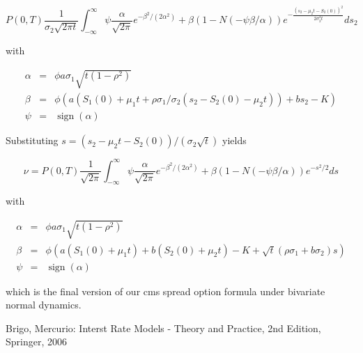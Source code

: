\documentclass{amsart}
\theoremstyle{plain}
\numberwithin{equation}{section}
\DeclareMathOperator{\sign}{sign}
\begin{document}
\begin{equation}
P(0,T) \frac{1}{\sigma_2\sqrt{2\pi t}} \int_{-\infty}^\infty \psi\frac{\alpha}{\sqrt{2\pi}}e^{-\beta^2/(2\alpha^2)}+\beta(1-N(-\psi\beta/\alpha))e^{-\frac{(s_2-\mu_2t-S_2(0))^2}{2\sigma_2^2 t}} ds_2
\end{equation}

with

\begin{eqnarray}
\alpha &=& \phi a \sigma_1 \sqrt{t(1-\rho^2)} \\
\beta &=& \phi \left( a (S_1(0) + \mu_1 t + \rho\sigma_1/\sigma_2(s_2- S_2(0) - \mu_2t)) + bs_2 - K \right) \\
\psi &=& \sign(\alpha)
\end{eqnarray}

Substituting $s = (s_2 - \mu_2t - S_2(0)) / (\sigma_2\sqrt{t})$ yields

\begin{equation}
\nu = P(0,T) \frac{1}{\sqrt{2\pi}} \int_{-\infty}^\infty \psi\frac{\alpha}{\sqrt{2\pi}}e^{-\beta^2/(2\alpha^2)}+\beta(1-N(-\psi\beta/\alpha))e^{-s^2/2} ds
\end{equation}

with

\begin{eqnarray}
\alpha &=& \phi a \sigma_1 \sqrt{t(1-\rho^2)} \\
\beta &=& \phi \left(a (S_1(0) + \mu_1 t) + b (S_2(0) + \mu_2t) - K +  \sqrt{t}(\rho\sigma_1+b\sigma_2) s \right) \\
\psi &=& \sign(\alpha)
\end{eqnarray}

which is the final version of our cms spread option formula under bivariate normal dynamics.

\begin{thebibliography}{1}
Brigo, Mercurio: Interst Rate Models - Theory and Practice, 2nd Edition, Springer, 2006
\end{thebibliography}
\end{document}
